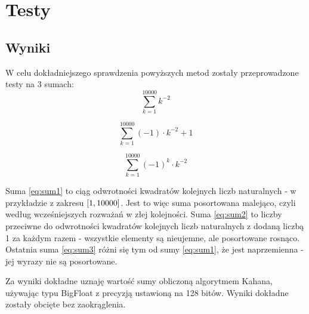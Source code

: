 \documentclass[11pt]{article}
\begin{document}
\section{Testy}
\label{sec:testy}

\subsection{Wyniki}
W celu dokładniejszego sprawdzenia powyższych metod zostały przeprowadzone testy na 3 sumach:
\begin{equation}\label{eq:sum1}
\sum_{k=1}^{10000} k^{-2}
\end{equation}

\begin{equation}\label{eq:sum2}
\sum_{k=1}^{10000} (-1) \cdot k^{-2} + 1
\end{equation}

\begin{equation}\label{eq:sum3}
\sum_{k=1}^{10000} (-1)^{k} \cdot  k^{-2}
\end{equation}

Suma \ref{eq:sum1} to ciąg odwrotności kwadratów kolejnych liczb naturalnych - w przykładzie z zakresu $\interval{1}{10000}$. Jest to więc suma posortowana malejąco, czyli według wcześniejszych rozważań w złej kolejności. Suma \ref{eq:sum2} to liczby przeciwne do odwrotności kwadratów kolejnych liczb naturalnych z dodaną liczbą 1 za każdym razem - wszystkie elementy są nieujemne, ale posortowane rosnąco. Ostatnia suma \ref{eq:sum3} różni się tym od sumy \ref{eq:sum1}, że jest naprzemienna - jej wyrazy nie są posortowane.

Za wyniki dokładne uznaję wartość sumy obliczoną algorytmem Kahana, używając typu BigFloat z precyzją ustawioną na 128 bitów. Wyniki dokładne zostały obcięte bez zaokrąglenia.
  
\end{document}
